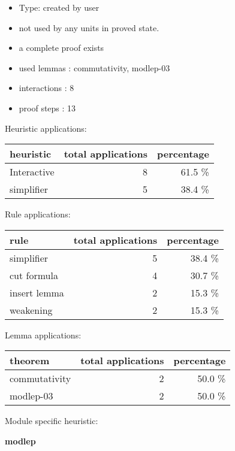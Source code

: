 \documentclass[a4paper]{article}
\begin{document}
\begin{itemize}

\item Type: created by user

\item not used by any units in proved state.
\item       a complete proof exists
\item       used lemmas  : commutativity, modlep-03
\item       interactions : 8
\item       proof steps  : 13
\end{itemize}

\medskip


Heuristic applications:

\begin{supertabular}{l|r|r}
heuristic	& total applications & percentage \\ \hline
Interactive & 8 & 61.5 \% \\
simplifier & 5 & 38.4 \% \\

\end{supertabular}

Rule applications:

\begin{supertabular}{l|r|r}
rule	        & total applications & percentage \\ \hline
simplifier & 5 & 38.4 \% \\
cut formula & 4 & 30.7 \% \\
insert lemma & 2 & 15.3 \% \\
weakening & 2 & 15.3 \% \\

\end{supertabular}

Lemma applications:

\begin{supertabular}{l|r|r}
theorem	        & total applications & percentage \\ \hline
commutativity & 2 & 50.0 \% \\
modlep-03 & 2 & 50.0 \% \\

\end{supertabular}

Module specific heuristic:

\pagebreak

{\LARGE\bf modlep}\label{lemma-modlep}

\medskip
\end{document}

